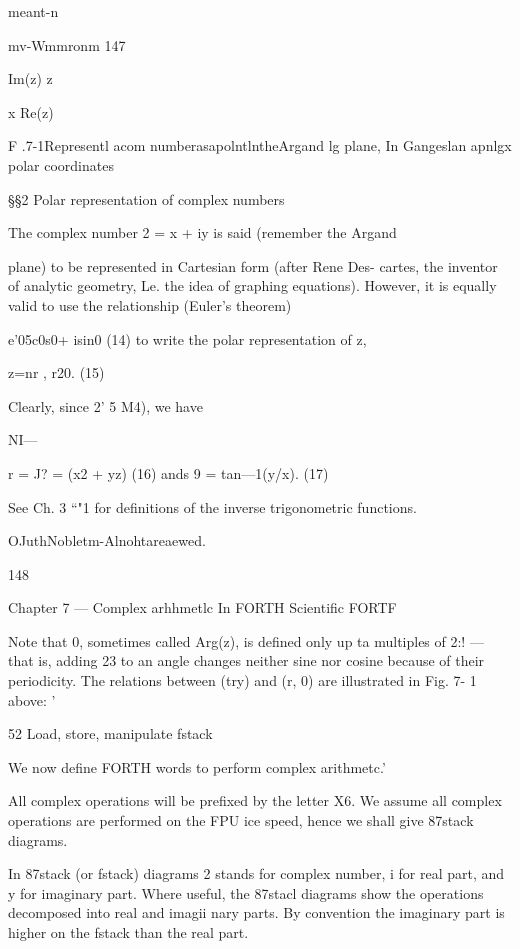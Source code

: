  

{meant-n

 

mv-Wmmronm 147

 

Im(z) z

 

 

x Re(z)

 

 

 

F .7-1Representl acom numberasapolntlntheArgand
lg plane, In Gangeslan apnlgx polar coordinates

§§2 Polar representation of complex numbers

The complex number 2 = x + iy is said (remember the Argand

plane) to be represented in Cartesian form (after Rene Des-
cartes, the inventor of analytic geometry, Le. the idea of graphing
equations). However, it is equally valid to use the relationship
(Euler’s theorem)

e'05c0s0+ isin0 (14)
to write the polar representation of z,

z=nr , r20. (15)

Clearly, since 2' 5 M4), we have

NI—

r = J? = (x2 + yz) (16)
ands
9 = tan—1(y/x). (17)

 

See Ch. 3 “"1 for deﬁnitions of the inverse trigonometric functions.

OJuthNobletm-Alnohtareaewed.

148

Chapter 7 — Complex arhhmetlc In FORTH Scientific FORTF

Note that 0, sometimes called Arg(z), is deﬁned only up ta
multiples of 2:! — that is, adding 23 to an angle changes neither
sine nor cosine because of their periodicity. The relations between
(try) and (r, 0) are illustrated in Fig. 7- 1 above: '

52 Load, store, manipulate fstack

We now deﬁne FORTH words to perform complex arithmetc.’

All complex operations will be preﬁxed by the letter X6. We
assume all complex operations are performed on the FPU ice
speed, hence we shall give 87stack diagrams.

In 87stack (or fstack) diagrams 2 stands for complex number, i
for real part, and y for imaginary part. Where useful, the 87stacl
diagrams show the operations decomposed into real and imagii
nary parts. By convention the imaginary part is higher on the
fstack than the real part.

}
